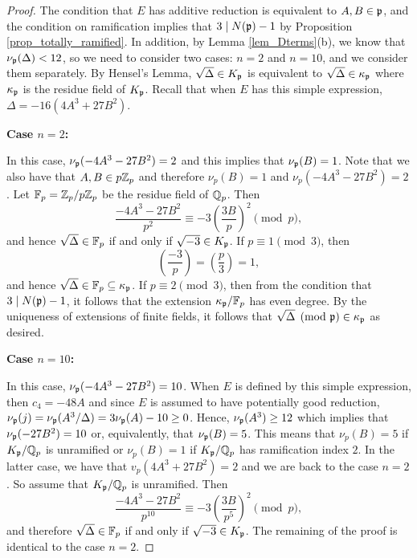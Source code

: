\begin{proof}
    The condition that $E$ has additive reduction is equivalent to $A,B\in\mathfrak{p}$, and the condition on ramification implies that $3\mid N(\mathfrak{p})-1$ by Proposition \ref{prop_totally_ramified}. In addition, by Lemma \ref{lem_Dterms}(b), we know that $\nu_{\mathfrak{p}}(\Delta)<12$, so we need to consider two cases: $n=2$ and $n=10$, and we consider them separately. By Hensel's Lemma, $\sqrt{\Delta}\in K_{\mathfrak{p}}$ is equivalent to $\sqrt{\Delta}\in \kappa_{\mathfrak{p}}$ where $\kappa_{\mathfrak{p}}$ is the residue field of $K_{\mathfrak{p}}$. Recall that when $E$ has this simple expression, $\Delta=-16(4A^3+27B^2)$.


    \textbf{Case $n=2$:}

    In this case, $\nu_{\mathfrak{p}}(-4A^3-27B^2)=2$ and this implies that $\nu_{\mathfrak{p}}(B)=1$. Note that we also have that $A,B\in p\mathbb{Z}_p$ and therefore $\nu_p(B)=1$ and $\nu_p(-4A^3-27B^2)=2$. Let $\mathbb{F}_p=\mathbb{Z}_p/p\mathbb{Z}_p$ be the residue field of $\mathbb{Q}_p$. Then 
    $$\frac{-4A^3-27B^2}{p^2}\equiv -3\left(\frac{3B}{p}\right)^2\pmod{p},$$
    and hence $\sqrt{\Delta}\in\mathbb{F}_p$ if and only if $\sqrt{-3}\in K_{\mathfrak{p}}$. 
    If $p\equiv1\pmod{3}$, then
    $$\left(\frac{-3}{p}\right)=\left(\frac{p}{3}\right)=1,$$
    and hence $\sqrt{\Delta}\in \mathbb{F}_p\subseteq \kappa_{\mathfrak{p}}$. If $p\equiv 2\pmod{3}$, then from the condition that $3\mid N(\mathfrak{p})-1$, it follows that the extension $\kappa_{\mathfrak{p}}/\mathbb{F}_p$ has even degree. By the uniqueness of extensions of finite fields, it follows that $\sqrt{\Delta}\pmod{\mathfrak{p}}\in\kappa_{\mathfrak{p}}$ as desired.

    \textbf{Case $n=10$:} 

    In this case, $\nu_{\mathfrak{p}}(-4A^3-27B^2)=10$. When $E$ is defined by this simple expression, then $c_4=-48A$ and since $E$ is assumed to have potentially good reduction, $\nu_{\mathfrak{p}}(j)=\nu_{\mathfrak{p}}(A^3/\Delta)=3\nu_{\mathfrak{p}}(A)-10\geq 0$. Hence, $\nu_{\mathfrak{p}}(A^3)\geq12$ which implies that $\nu_{\mathfrak{p}}(-27B^2)=10$ or, equivalently, that $\nu_{\mathfrak{p}}(B)=5$. This means that $\nu_p(B)=5$ if $K_{\mathfrak{p}}/\mathbb{Q}_p$ is unramified or $\nu_p(B)=1$ if $K_{\mathfrak{p}}/\mathbb{Q}_p$ has ramification index $2$. In the latter case, we have that $v_p(4A^3+27B^2)=2$ and we are back to the case $n=2$. So assume that $K_{\mathfrak{p}}/\mathbb{Q}_p$ is unramified. Then
    $$\frac{-4A^3-27B^2}{p^{10}}\equiv -3\left(\frac{3B}{p^5}\right)^2\pmod{p},$$
    and therefore $\sqrt{\Delta}\in\mathbb{F}_p$ if and only if $\sqrt{-3}\in K_{\mathfrak{p}}$. The remaining of the proof is identical to the case $n=2$.

\end{proof}











